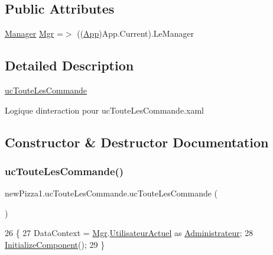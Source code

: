 \subsection*{Public Attributes}
\begin{DoxyCompactItemize}
\item 
\hyperlink{classModele_1_1Manager}{Manager} \hyperlink{classnewPizza1_1_1ucTouteLesCommande_a838259c75d2541088575b748ba920fb4}{Mgr} =$>$ ((\hyperlink{classnewPizza1_1_1App}{App})App.\+Current).Le\+Manager
\end{DoxyCompactItemize}


\subsection{Detailed Description}
\hyperlink{classnewPizza1_1_1ucTouteLesCommande}{uc\+Toute\+Les\+Commande} 

Logique d\textquotesingle{}interaction pour uc\+Toute\+Les\+Commande.\+xaml 

\subsection{Constructor \& Destructor Documentation}
\mbox{\label{classnewPizza1_1_1ucTouteLesCommande_af1ad8d344810b2a2c6d55f134ea60c1b}} 
\subsubsection{\texorpdfstring{uc\+Toute\+Les\+Commande()}{ucTouteLesCommande()}}
{\footnotesize\ttfamily new\+Pizza1.\+uc\+Toute\+Les\+Commande.\+uc\+Toute\+Les\+Commande (\begin{DoxyParamCaption}{ }\end{DoxyParamCaption})\hspace{0.3cm}{\ttfamily [inline]}}


\begin{DoxyCode}
26         \{
27             DataContext = \hyperlink{classnewPizza1_1_1ucTouteLesCommande_a838259c75d2541088575b748ba920fb4}{Mgr}.\hyperlink{classModele_1_1Manager_aa00c4632bd15b247d6b6793a6797dc82}{UtilisateurActuel} as 
      \hyperlink{classModele_1_1Administrateur}{Administrateur};
28             \hyperlink{classnewPizza1_1_1ucTouteLesCommande_a8349ab5709ac09dd8c7e3f8d2cc0b633}{InitializeComponent}();
29         \}
\end{DoxyCode}


